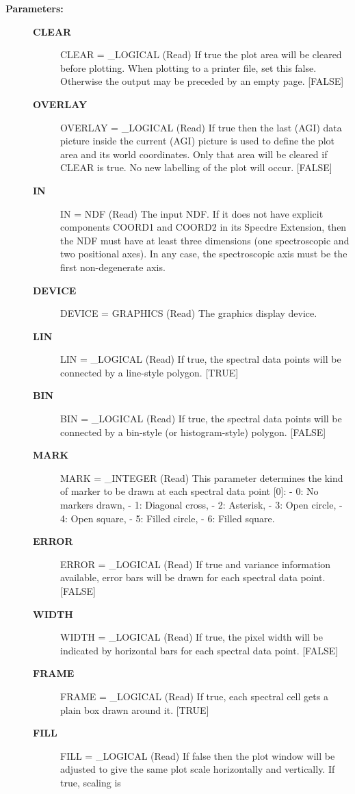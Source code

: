 \begin{description}
\item [{\bf Parameters:}]
\begin{description}
\item [{\bf CLEAR}]
CLEAR = _LOGICAL (Read)
   If true the plot area will be cleared before plotting. When
   plotting to a printer file, set this false. Otherwise the
   output may be preceded by an empty page. [FALSE]
\item [{\bf OVERLAY}]
OVERLAY = _LOGICAL (Read)
   If true then the last (AGI) data picture inside the current
   (AGI) picture is used to define the plot area and its world
   coordinates. Only that area will be cleared if CLEAR is
   true. No new labelling of the plot will occur. [FALSE]
\item [{\bf IN}]
IN = NDF (Read)
   The input NDF. If it does not have explicit components COORD1
   and COORD2 in its Specdre Extension, then the NDF must have at
   least three dimensions (one spectroscopic and two positional
   axes). In any case, the spectroscopic axis must be the first
   non-degenerate axis.
\item [{\bf DEVICE}]
DEVICE = GRAPHICS (Read)
   The graphics display device.
\item [{\bf LIN}]
LIN = _LOGICAL (Read)
   If true, the spectral data points will be connected by a
   line-style polygon. [TRUE]
\item [{\bf BIN}]
BIN = _LOGICAL (Read)
   If true, the spectral data points will be connected by a
   bin-style (or histogram-style) polygon. [FALSE]
\item [{\bf MARK}]
MARK = _INTEGER (Read)
   This parameter determines the kind of marker to be drawn at
   each spectral data point [0]:
   -  0: No markers drawn,
   -  1: Diagonal cross,
   -  2: Asterisk,
   -  3: Open circle,
   -  4: Open square,
   -  5: Filled circle,
   -  6: Filled square.
\item [{\bf ERROR}]
ERROR = _LOGICAL (Read)
   If true and variance information available, error bars will be
   drawn for each spectral data point. [FALSE]
\item [{\bf WIDTH}]
WIDTH = _LOGICAL (Read)
   If true, the pixel width will be indicated by horizontal bars
   for each spectral data point. [FALSE]
\item [{\bf FRAME}]
FRAME = _LOGICAL (Read)
   If true, each spectral cell gets a plain box drawn around
   it. [TRUE]
\item [{\bf FILL}]
FILL = _LOGICAL (Read)
   If false then the plot window will be adjusted to give the same
   plot scale horizontally and vertically. If true, scaling is

\end{description}
\end{description}
